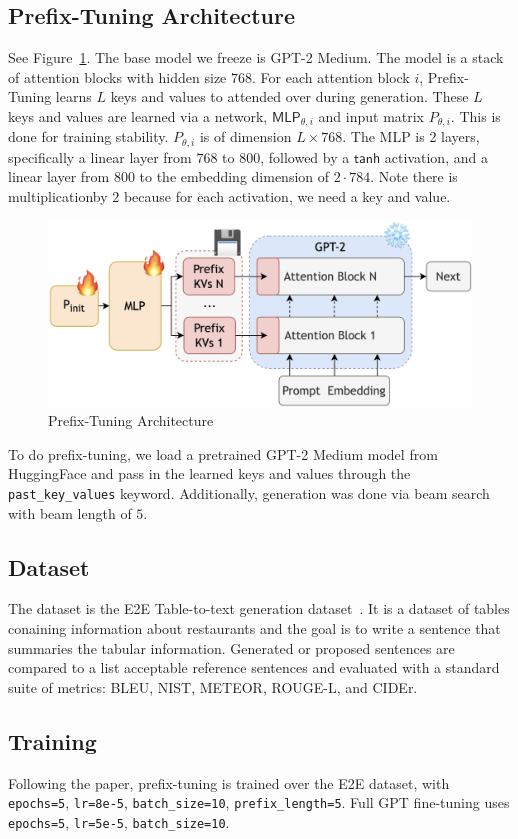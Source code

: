 \documentclass[11pt]{article} %
\begin{document}
\subsection{Prefix-Tuning Architecture}
See Figure~\ref{fig:prefix_tuning}. The base model we freeze is GPT-2 Medium. The model is a stack of attention blocks with hidden size $768$. For each attention block $i$, Prefix-Tuning learns $L$ keys and values to attended over during generation. These $L$ keys and values are learned via a network, $\textsf{MLP}_{\theta,i}$ and input matrix $P_{\theta,i}$. This is done for training stability. $P_{\theta,i}$ is of dimension $L\times 768$. The MLP is 2 layers, specifically a linear layer from $768$ to $800$, followed by a $\textsf{tanh}$ activation, and a linear layer from $800$ to the embedding dimension of $2\cdot 784$. Note there is multiplicationby $2$ because for each activation, we need a key and value.
\begin{figure}
    \centering
    \includegraphics[width=0.75\linewidth]{prefix-architecture.png}
    \caption{Prefix-Tuning Architecture}
    \label{fig:prefix_tuning}
\end{figure}

To do prefix-tuning, we load a pretrained GPT-2 Medium model from HuggingFace and pass in the learned keys and values through the \verb|past_key_values| keyword. Additionally, generation was done via beam search with beam length of $5$.

\subsection{Dataset}
The dataset is the E2E Table-to-text generation dataset~\cite{novikova-etal-2017-e2e}. It is a dataset of tables conaining information about restaurants and the goal is to write a sentence that summaries the tabular information. Generated or proposed sentences are compared to a list acceptable reference sentences and evaluated with a standard suite of metrics: BLEU, NIST, METEOR, ROUGE-L, and CIDEr.

\subsection{Training}
Following the paper, prefix-tuning is trained over the E2E dataset, with \texttt{epochs=5}, \texttt{lr=8e-5}, \texttt{batch\_size=10}, \texttt{prefix\_length=5}. Full GPT fine-tuning uses \texttt{epochs=5}, \texttt{lr=5e-5}, \texttt{batch\_size=10}.
\end{document}
